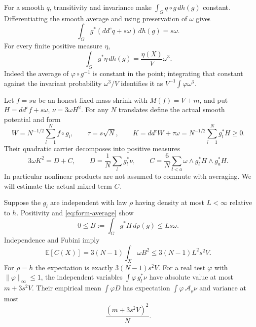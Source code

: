 \documentclass[11pt]{article}
\newcommand{\ddc}{dd^c}
\newcommand{\E}{\mathbb E}
\begin{document}
For a smooth $q$, transitivity and invariance make
$\int_G q\circ g\,dh(g)$ constant. Differentiating the smooth average
and using preservation of $\omega$ gives
\[
 \int_Gg^*(\ddc q+s\omega)\,dh(g)=s\omega.
 \tag{1}\label{eq:form-average}
\]
For every finite positive measure $\eta$,
\[
 \int_Gg^*\eta\,dh(g)=\frac{\eta(X)}V\omega^3.
 \tag{2}\label{eq:measure-average}
\]
Indeed the average of $\varphi\circ g^{-1}$ is constant in the point;
integrating that constant against the invariant probability
$\omega^3/V$ identifies it as $V^{-1}\int\varphi\omega^3$.

Let $f=su$ be an honest fixed-mass shrink with $M(f)=V+m$, and put
$H=\ddc f+s\omega$, $\nu=3\omega H^2$.
For any $N$ translates define the actual smooth potential and form
\[
 W=N^{-1/2}\sum_{l=1}^N f\circ g_l,\qquad
 \tau=s\sqrt N,\qquad
 K=\ddc W+\tau\omega=N^{-1/2}\sum_{l=1}^Ng_l^*H\geq0.
\]
Their quadratic carrier decomposes into positive measures
\[
 3\omega K^2=D+C,\qquad
 D=\frac1N\sum_lg_l^*\nu,\qquad
 C=\frac6N\sum_{l<a}\omega\wedge g_l^*H\wedge g_a^*H.
 \tag{3}\label{eq:diagonal}
\]
In particular nonlinear products are not assumed to commute with
averaging. We will estimate the actual mixed term $C$.

Suppose the $g_l$ are independent with law $\rho$ having density
at most $L<\infty$ relative to $h$. Positivity and
\eqref{eq:form-average} show
\[
 0\leq B:=\int_Gg^*H\,d\rho(g)\leq Ls\omega.
\]
Independence and Fubini imply
\[
 \E[C(X)]=3(N-1)\int_X\omega B^2
                    \leq3(N-1)L^2s^2V.
 \tag{4}\label{eq:cross}
\]
For $\rho=h$ the expectation is exactly $3(N-1)s^2V$.
For a real test $\varphi$ with $\|\varphi\|_\infty\leq1$, the
independent variables $\int\varphi\,g_l^*\nu$ have absolute value
at most $m+3s^2V$. Their empirical mean $\int\varphi D$ has expectation
$\int\varphi\,\mathcal A_\rho\nu$ and variance at most
\[
 \frac{(m+3s^2V)^2}{N}.
 \tag{5}\label{eq:variance}
\]
\end{document}
